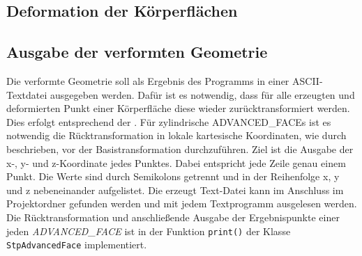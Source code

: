 \subsection{Deformation der Körperflächen}

\subsection{Ausgabe der verformten Geometrie}

Die verformte Geometrie soll als Ergebnis des Programms in einer ASCII-Textdatei ausgegeben werden. Dafür ist es notwendig, dass für alle erzeugten und deformierten Punkt einer Körperfläche diese wieder zurücktransformiert werden. Dies erfolgt entsprechend der . Für zylindrische ADVANCED\_FACEs ist es notwendig die Rücktransformation in lokale kartesische Koordinaten, wie durch  beschrieben, vor der Basistransformation durchzuführen. 
Ziel ist die Ausgabe der x-, y- und z-Koordinate jedes Punktes. Dabei entspricht jede Zeile genau einem Punkt. Die Werte sind durch Semikolons getrennt und in der Reihenfolge x, y und z nebeneinander aufgelistet. Die erzeugt Text-Datei kann im Anschluss im Projektordner  gefunden werden und mit jedem Textprogramm ausgelesen werden. Die Rücktransformation und anschließende Ausgabe der Ergebnispunkte einer jeden \textit{ADVANCED\_FACE} ist in der Funktion \verb|print()| der Klasse \verb|StpAdvancedFace| implementiert.







           


       

        








    













  
